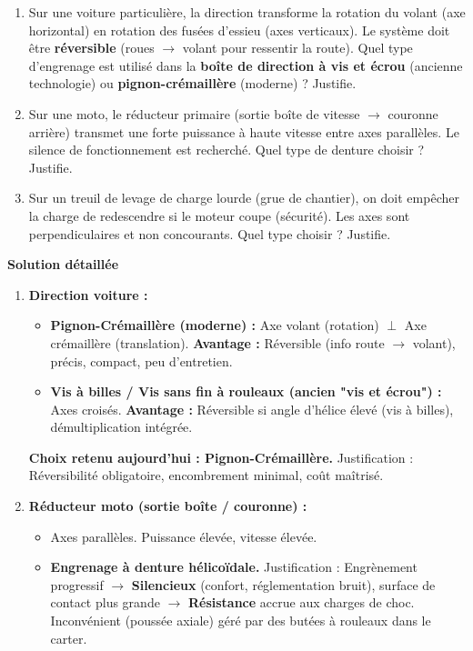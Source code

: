 \documentclass[11pt]{article}
\begin{document}
\begin{exoresolu}
    \begin{enumerate}
        \item Sur une voiture particulière, la direction transforme la rotation du volant (axe horizontal) en rotation des fusées d'essieu (axes verticaux). Le système doit être \textbf{réversible} (roues $\rightarrow$ volant pour ressentir la route). Quel type d'engrenage est utilisé dans la \textbf{boîte de direction à vis et écrou} (ancienne technologie) ou \textbf{pignon-crémaillère} (moderne) ? Justifie.
        \item Sur une moto, le réducteur primaire (sortie boîte de vitesse $\rightarrow$ couronne arrière) transmet une forte puissance à haute vitesse entre axes parallèles. Le silence de fonctionnement est recherché. Quel type de denture choisir ? Justifie.
        \item Sur un treuil de levage de charge lourde (grue de chantier), on doit empêcher la charge de redescendre si le moteur coupe (sécurité). Les axes sont perpendiculaires et non concourants. Quel type choisir ? Justifie.
    \end{enumerate}
    \tcblower
    \textbf{Solution détaillée}
    \begin{enumerate}
        \item \textbf{Direction voiture :}
              \begin{itemize}
                  \item \textbf{Pignon-Crémaillère (moderne) :} Axe volant (rotation) $\perp$ Axe crémaillère (translation). \textbf{Avantage :} Réversible (info route $\rightarrow$ volant), précis, compact, peu d'entretien.
                  \item \textbf{Vis à billes / Vis sans fin à rouleaux (ancien "vis et écrou") :} Axes croisés. \textbf{Avantage :} Réversible si angle d'hélice élevé (vis à billes), démultiplication intégrée.
              \end{itemize}
              \textbf{Choix retenu aujourd'hui : Pignon-Crémaillère.} Justification : Réversibilité obligatoire, encombrement minimal, coût maîtrisé.
        \item \textbf{Réducteur moto (sortie boîte / couronne) :}
              \begin{itemize}
                  \item Axes parallèles. Puissance élevée, vitesse élevée.
                  \item \textbf{Engrenage à denture hélicoïdale.} Justification : Engrènement progressif $\rightarrow$ \textbf{Silencieux} (confort, réglementation bruit), surface de contact plus grande $\rightarrow$ \textbf{Résistance} accrue aux charges de choc. Inconvénient (poussée axiale) géré par des butées à rouleaux dans le carter.

\end{itemize}
\end{enumerate}
\end{exoresolu}
\end{document}
